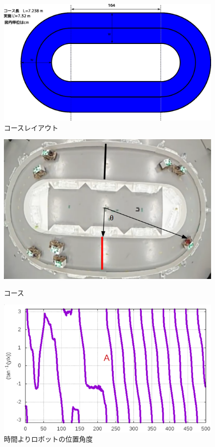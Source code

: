 \documentclass[twocolumn]{jarticle} %
\begin{document}
\begin{figure}[!ht]
    \centering
    \includegraphics[width=0.7\linewidth]{Oval_h2.eps}
    \caption{コースレイアウト}
\end{figure}


\begin{figure}[h]
    \begin{minipage}{0.48\linewidth}
        \centering
        \includegraphics[width=1.0\linewidth]{course3.jpg}
        \caption{コース}
    \end{minipage}
    \begin{minipage}{0.48\linewidth}
        \centering
        \includegraphics[width=1.0\linewidth]{number2.jpg}
        \caption{時間よりロボットの位置角度}
    \end{minipage}
\end{figure}
\end{document}
